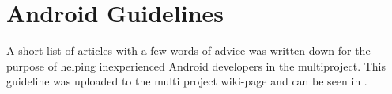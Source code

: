 
\section{Android Guidelines}

A short list of articles with a few words of advice was written down for the purpose of helping inexperienced Android developers in the multiproject. This guideline was uploaded to the multi project wiki-page and can be seen in . 